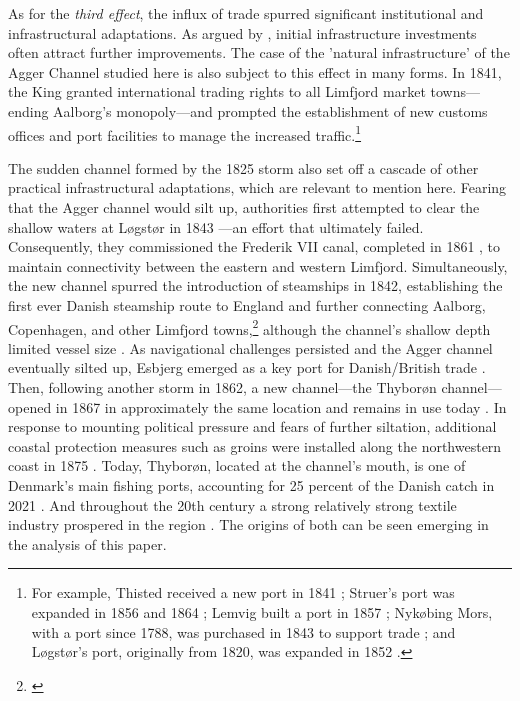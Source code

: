 \documentclass[12pt]{article}
\begin{document}
As for the \textit{third effect}, the influx of trade spurred significant institutional and infrastructural adaptations. As argued by \cite{Redding2015}, initial infrastructure investments often attract further improvements. The case of the 'natural infrastructure' of the Agger Channel studied here is also subject to this effect in many forms. In 1841, the King granted international trading rights to all Limfjord market towns—ending Aalborg's monopoly—and prompted the establishment of new customs offices and port facilities to manage the increased traffic.\footnote{For example, Thisted received a new port in 1841 \citep[p. 384-386]{Dioerup1842Thisted}; Struer’s port was expanded in 1856 and 1864 \citep[vol V, p. 467]{Trap3}; Lemvig built a port in 1857 \citep[vol V, p. 474]{Trap3}; Nykøbing Mors, with a port since 1788, was purchased in 1843 to support trade \citep[vol IV, p. 214]{Trap3}; and Løgstør’s port, originally from 1820, was expanded in 1852 \citep[vol IV, pp. 399-400]{Trap3}.}

The sudden channel formed by the 1825 storm also set off a cascade of other practical infrastructural adaptations, which are relevant to mention here. Fearing that the Agger channel would silt up, authorities first attempted to clear the shallow waters at Løgstør in 1843 \citep[p. 311, p. 4]{Bergsoee1844}—an effort that ultimately failed. Consequently, they commissioned the Frederik VII canal, completed in 1861 \citep{Petersen1877}, to maintain connectivity between the eastern and western Limfjord. Simultaneously, the new channel spurred the introduction of steamships in 1842, establishing the first ever Danish steamship route to England and further connecting Aalborg, Copenhagen, and other Limfjord towns,\footnote{\citet{Klem1967, Schovelin1891, Lampe2015DanesUK}} although the channel’s shallow depth limited vessel size \citep{Lassen1883}. As navigational challenges persisted and the Agger channel eventually silted up, Esbjerg emerged as a key port for Danish/British trade \citep{Lampe2015DanesUK}. Then, following another storm in 1862, a new channel—the Thyborøn channel—opened in 1867 in approximately the same location and remains in use today \citep{Petersen1877, Ravn1993}. In response to mounting political pressure and fears of further siltation, additional coastal protection measures such as groins were installed along the northwestern coast in 1875 \citep{petersen1853oplysende, Trap3}. Today, Thyborøn, located at the channel's mouth, is one of Denmark's main fishing ports, accounting for 25 percent of the Danish catch in 2021 \citep{MinisterietforFodevarer2022}. And throughout the 20th century a strong relatively strong textile industry prospered in the region \citep{MirakletPaaHeden2025}. The origins of both can be seen emerging in the analysis of this paper. 
\end{document}
